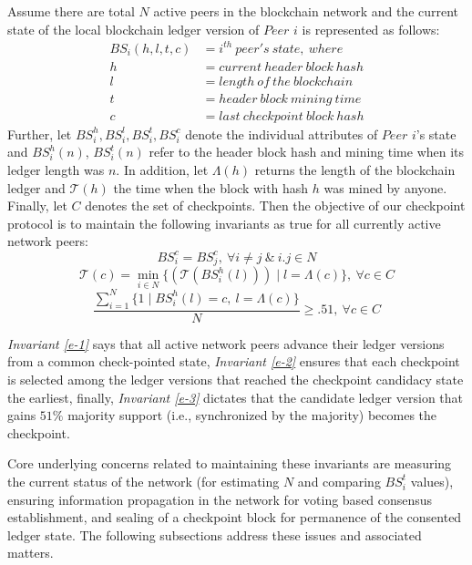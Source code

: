 Assume there are total $N$ active peers in the blockchain network and the current state of the local blockchain ledger version of $Peer$ $i$ is represented as follows:
\begin{equation*}
\begin{split}
	BS_i(h, l, t, c) & = i^{th}\ peer's\ state,\ where \\
	h & = current\ header\ block\ hash \\
	l & = length\ of\ the\ blockchain \\
	t & = header\ block\ mining\ time \\
	c & = last\ checkpoint\ block\ hash	 
\end{split}
\end{equation*}
Further, let $BS_i^h, BS_i^l, BS_i^t, BS_i^c$ denote the individual attributes of $Peer$ $i$'s state and $BS_i^h(n)$, $BS_i^t(n)$ refer to the header block hash and mining time when its ledger length was $n$. In addition, let $\Lambda(h)$ returns the length of the blockchain ledger and $\mathcal{T}(h)$ the time when the block with hash $h$ was mined by anyone. Finally, let $C$ denotes the set of checkpoints. Then the objective of our checkpoint protocol is to maintain the following invariants as true for all currently active network peers:
\begin{equation}
\label{e-1}
BS_i^c = BS_j^c,\ \forall i \neq j\ \&\ i.j \in N
\end{equation}
\begin{equation}
\label{e-2}
\mathcal{T}(c) = \min_{i \in N}\{(\mathcal{T}(BS_i^h(l))) \mid l = \Lambda(c)\},\ \forall c \in C  
\end{equation}
\begin{equation}
\label{e-3}
\frac{\sum_{i = 1}^N{\{1 \mid BS_i^h(l) = c,\ l = \Lambda(c)}\}}{N} \geq .51,\ \forall c \in C  
\end{equation}

\textit{Invariant \ref{e-1}} says that all active network peers advance their ledger versions from a common check-pointed state, \textit{Invariant \ref{e-2}} ensures that each checkpoint is selected among the ledger versions that reached the checkpoint candidacy state the earliest, finally, \textit{Invariant \ref{e-3}} dictates that the candidate ledger version that gains $51\%$ majority support (i.e., synchronized by the majority) becomes the checkpoint. 

Core underlying concerns related to maintaining these invariants are measuring the current status of the network (for estimating $N$ and comparing $BS_i^t$ values), ensuring information propagation in the network for voting based consensus establishment, and sealing of a checkpoint block for permanence of the consented ledger state. The following subsections address these issues and associated matters.    

